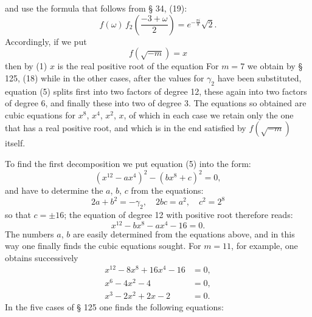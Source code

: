 and use the formula that follows from § 34, (19):
\[
f(\omega)\,f_2\left(\frac{-3+\omega}{2}\right) = e^{-\frac{\pi i}{8}}\sqrt{2}.
\]
Accordingly, if we put
\[
f(\sqrt{-m}) = x
\]
then by (1) $x$ is the real positive root of the equation
For $m = 7$ we obtain by § 125, (18)
while in the other cases, after the values for $\gamma_2$ have been
substituted, equation (5) splits first into two factors of degree 12,
these again into two factors of degree 6, and finally these into two
of degree 3. The equations so obtained are cubic equations
for $x^8$, $x^4$, $x^2$, $x$, of which in each case we retain only the one
that has a real positive root, and which is in the end satisfied by
$f(\sqrt{-m})$ itself.

To find the first decomposition we put equation
(5) into the form:
\[
(x^{12} - a x^4)^2 - (b x^8 + c)^2 = 0,
\]
and have to determine the  $a$, $b$, $c$ from the equations:
\[
2a + b^2 = -\gamma_2, \quad 2bc = a^2, \quad c^2 = 2^8
\]
so that $c = \pm 16$; the equation of degree 12 with
positive root therefore reads:
\[
x^{12} - b x^8 - a x^4 - 16 = 0.
\]
The numbers $a$, $b$ are easily determined from the equations above,
and in this way one finally finds the cubic equations
sought. For $m = 11$, for example, one obtains successively
\[
\begin{aligned}
x^{12} - 8x^8 + 16x^4 - 16 &= 0,\\
x^6 - 4x^2 - 4 &= 0,\\
x^3 - 2x^2 + 2x - 2 &= 0.
\end{aligned}
\]
In the five cases of § 125 one finds the following equations:
